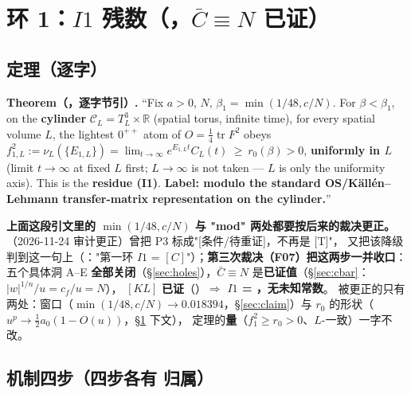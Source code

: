 \section{环 1：$I1$ 残数（\LT{}，$\bar C\equiv N$ 已证）}\label{sec:i1}

\subsection{定理（逐字）}

\begin{quotebox}
\textbf{Theorem（，逐字节引）.} ``Fix $a>0$, $N$,
$\beta_1=\min(1/48,c/N)$. For $\beta<\beta_1$, on the \textbf{cylinder} $\mathcal{C}_L=T^3_L\times\mathbb{R}$
(spatial torus, infinite time), for every spatial volume $L$, the lightest $0^{++}$ atom of
$O=\tfrac14\operatorname{tr}F^2$ obeys
$f_{1,L}^2:=\nu_L(\{E_{1,L}\})=\lim_{t\to\infty}e^{E_{1,L}t}C_L(t)\ \ge\ r_0(\beta)>0$,
\textbf{uniformly in $L$} (limit $t\to\infty$ at fixed $L$ first; $L\to\infty$ is not taken --- $L$ is only the
uniformity axis). This is the \textbf{residue (I1)}.
\textbf{Label: \LT{} modulo the standard OS/Källén--Lehmann transfer-matrix representation on the cylinder.}''
\end{quotebox}

\textbf{上面这段引文里的 $\min(1/48,c/N)$ 与 "mod" 两处都要按后来的裁决更正。}
（2026-11-24 审计更正）曾把 P3 标成"[条件/待重证]，不再是 [T]"，
 又把该降级判到这一句上（："第一环 $I1$ = $[C]$"）；\textbf{第三次裁决（F07）把这两步一并收口}：
五个具体洞 A--E \textbf{全部关闭}（\S\ref{sec:holes}），$\bar C\equiv N$ 是\textbf{已证值}（\S\ref{sec:cbar}：$|w|^{1/n}/u=c_f/u=N$），
$[KL]$ \textbf{已证}（）$\Rightarrow$ \textbf{$I1$ = \LT，无未知常数}。
被更正的只有两处：窗口（$\min(1/48,c/N)\to0.018394$，\S\ref{sec:claim}）与 $r_0$ 的形状（$u^p\to\tfrac12a_0(1-O(u))$，\S\ref{sec:i1} 下文），
定理的\textbf{量}（$f_1^2\ge r_0>0$、$L$-一致）一字不改。

\subsection{机制四步（四步各有 \LT{} 归属）}

